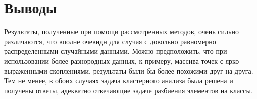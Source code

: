 \documentclass[a4paper,12pt]{article}
\begin{document}
\newpage\section{Выводы}
Результаты, полученные при помощи рассмотренных методов, очень сильно различаются, что вполне очевидн для случая с довольно равномерно распределенными случайными данными. Можно предположить, что при использовании более разнородных данных, к примеру, массива точек с ярко выраженными скоплениями, результаты были бы более похожими друг на друга. Тем не менее, в обоих случаях задача кластерного анализа была решена и получены ответы, адекватно отвечающие задаче разбиения элементов на классы.
\end{document}
